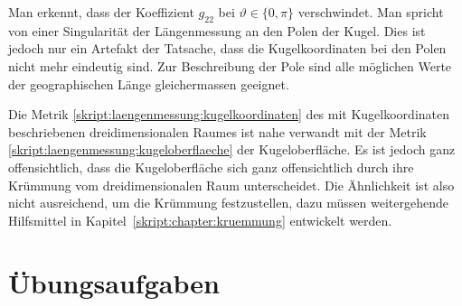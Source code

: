 Man erkennt, dass der Koeffizient $g_{22}$ bei $\vartheta \in\{0,\pi\}$
verschwindet.
Man spricht von einer Singularität der Längenmessung an den Polen der Kugel.
Dies ist jedoch nur ein Artefakt der Tatsache, dass die Kugelkoordinaten
bei den Polen nicht mehr eindeutig sind.
Zur Beschreibung der Pole sind alle möglichen Werte der geographischen
Länge gleichermassen geeignet.

Die Metrik 
\eqref{skript:laengenmessung:kugelkoordinaten}
des mit Kugelkoordinaten beschriebenen dreidimensionalen Raumes
ist nahe verwandt mit der Metrik
\eqref{skript:laengenmessung:kugeloberflaeche}
der Kugeloberfläche.
Es ist jedoch ganz offensichtlich, dass die Kugeloberfläche sich ganz
offensichtlich durch ihre Krümmung vom dreidimensionalen Raum unterscheidet.
Die Ähnlichkeit ist also nicht ausreichend, um die Krümmung festzustellen,
dazu müssen weitergehende Hilfsmittel in Kapitel~\ref{skript:chapter:kruemmung}
entwickelt werden.

\section{Übungsaufgaben}

